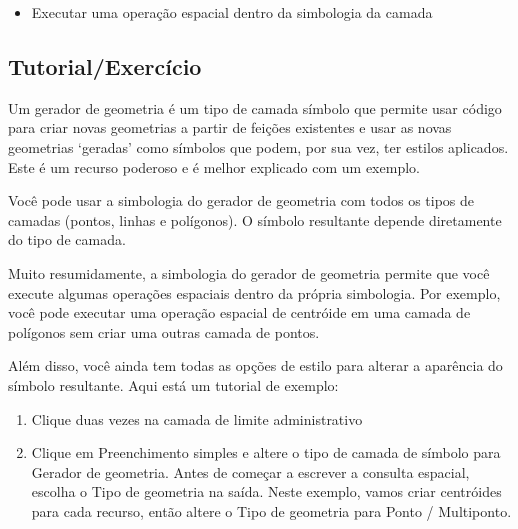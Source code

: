 \documentclass[
]{krantz}
\providecommand{\tightlist}{%
  \setlength{\itemsep}{0pt}\setlength{\parskip}{0pt}}
\begin{document}
\begin{itemize}
\tightlist
\item
  Executar uma operação espacial dentro da simbologia da camada
\end{itemize}

\hypertarget{tutorialexercuxedcio-1}{%
\subsection{Tutorial/Exercício}\label{tutorialexercuxedcio-1}}

Um gerador de geometria é um tipo de camada símbolo que permite usar código para criar novas geometrias a partir de feições existentes e usar as novas geometrias `geradas' como símbolos que podem, por sua vez, ter estilos aplicados. Este é um recurso poderoso e é melhor explicado com um exemplo.

Você pode usar a simbologia do gerador de geometria com todos os tipos de camadas (pontos, linhas e polígonos). O símbolo resultante depende diretamente do tipo de camada.

Muito resumidamente, a simbologia do gerador de geometria permite que você execute algumas operações espaciais dentro da própria simbologia. Por exemplo, você pode executar uma operação espacial de centróide em uma camada de polígonos sem criar uma outras camada de pontos.

Além disso, você ainda tem todas as opções de estilo para alterar a aparência do símbolo resultante. Aqui está um tutorial de exemplo:

\begin{enumerate}
\def\labelenumi{\arabic{enumi}.}
\tightlist
\item
  Clique duas vezes na camada de limite administrativo
\item
  Clique em Preenchimento simples e altere o tipo de camada de símbolo para Gerador de geometria. Antes de começar a escrever a consulta espacial, escolha o Tipo de geometria na saída. Neste exemplo, vamos criar centróides para cada recurso, então altere o Tipo de geometria para Ponto / Multiponto.
\end{enumerate}
\end{document}
